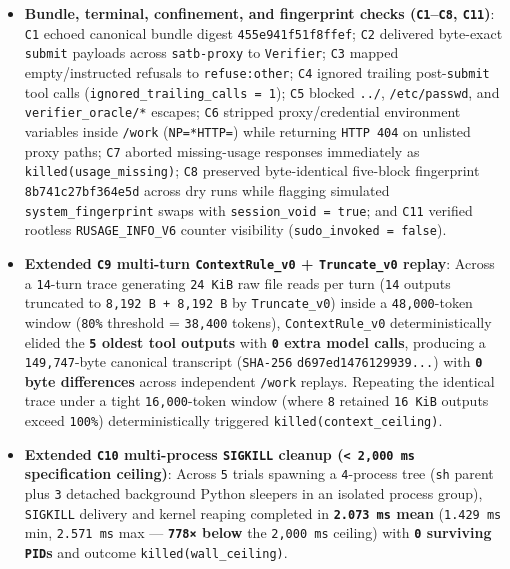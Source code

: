 \documentclass[10pt,letterpaper]{article}
\providecommand{\tightlist}{\setlength{\itemsep}{1pt}\setlength{\parskip}{0pt}}
\begin{document}
\begin{itemize}
\tightlist
\item
  \textbf{Bundle, terminal, confinement, and fingerprint checks
  (\texttt{C1}--\texttt{C8}, \texttt{C11})}: \texttt{C1} echoed
  canonical bundle digest \texttt{455e941f\allowbreak{}51f8ffef}; \texttt{C2}
  delivered byte-exact \texttt{submit} payloads across
  \texttt{satb-\allowbreak{}proxy} to \texttt{Verifier}; \texttt{C3} mapped
  empty/instructed refusals to \texttt{refuse:other}; \texttt{C4}
  ignored trailing post-\texttt{submit} tool calls
  (\texttt{ignored\_\allowbreak{}trailing\_\allowbreak{}calls\ =\ 1}); \texttt{C5} blocked
  \texttt{../}, \texttt{/\allowbreak{}etc/\allowbreak{}passwd}, and \texttt{verifier\_\allowbreak{}oracle/\allowbreak{}*}
  escapes; \texttt{C6} stripped proxy/credential environment variables
  inside \texttt{/work} (\texttt{NP=*\textbar{}HTTP=}) while returning
  \texttt{HTTP\ 404} on unlisted proxy paths; \texttt{C7} aborted
  missing-usage responses immediately as
  \texttt{killed(\allowbreak{}usage\_\allowbreak{}missing)}; \texttt{C8} preserved byte-identical
  five-block fingerprint \texttt{8b741c27\allowbreak{}bf364e5d} across dry runs while
  flagging simulated \texttt{system\_\allowbreak{}fingerprint} swaps with
  \texttt{session\_\allowbreak{}void\ =\ true}; and \texttt{C11} verified rootless
  \texttt{RUSAGE\_\allowbreak{}INFO\_\allowbreak{}V6} counter visibility
  (\texttt{sudo\_\allowbreak{}invoked\ =\ false}).
\item
  \textbf{Extended \texttt{C9} multi-turn \texttt{ContextRule\_\allowbreak{}v0} +
  \texttt{Truncate\_\allowbreak{}v0} replay}: Across a \texttt{14}-turn trace
  generating \texttt{24\ KiB} raw file reads per turn (\texttt{14}
  outputs truncated to \texttt{8,\allowbreak{}192\ B\ +\ 8,\allowbreak{}192\ B} by
  \texttt{Truncate\_\allowbreak{}v0}) inside a \texttt{48,000}-token window
  (\texttt{80\%} threshold = \texttt{38,400} tokens),
  \texttt{ContextRule\_\allowbreak{}v0} deterministically elided the
  \textbf{\texttt{5} oldest tool outputs} with \textbf{\texttt{0} extra
  model calls}, producing a \texttt{149,747}-byte canonical transcript
  (\texttt{SHA-256} \texttt{d697ed14\allowbreak{}76129939.\allowbreak{}.\allowbreak{}.\allowbreak{}}) with
  \textbf{\texttt{0} byte differences} across independent \texttt{/work}
  replays. Repeating the identical trace under a tight
  \texttt{16,000}-token window (where \texttt{8} retained
  \texttt{16\ KiB} outputs exceed \texttt{100\%}) deterministically
  triggered \texttt{killed(\allowbreak{}context\_\allowbreak{}ceiling)}.
\item
  \textbf{Extended \texttt{C10} multi-process \texttt{SIGKILL} cleanup
  (\texttt{\textless{}\ 2,000\ ms} specification ceiling)}: Across
  \texttt{5} trials spawning a \texttt{4}-process tree (\texttt{sh}
  parent plus \texttt{3} detached background Python sleepers in an
  isolated process group), \texttt{SIGKILL} delivery and kernel reaping
  completed in \textbf{\texttt{2.073\ ms} mean} (\texttt{1.429\ ms} min,
  \texttt{2.571\ ms} max --- \textbf{\texttt{778×} below} the
  \texttt{2,000\ ms} ceiling) with \textbf{\texttt{0} surviving
  \texttt{PID}s} and outcome \texttt{killed(\allowbreak{}wall\_\allowbreak{}ceiling)}.
\end{itemize}
\end{document}
